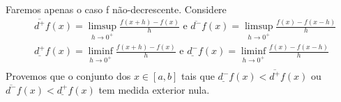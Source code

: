 \documentclass[analysis_notes.tex]{subfiles}
\begin{document}
\begin{proof*}
	Faremos apenas o caso f não-decrescente. Considere
	\begin{align*}
		 & \overline{d^{+}}f(x) = \limsup_{h\to 0^{+}} \frac{f(x+h)-f(x)}{h}\text{ e }\overline{d^{-}}f(x) = \limsup_{h\to 0^{+}}\frac{f(x) - f(x-h)}{h}   \\
		 & \underline{d^{+}}f(x) = \liminf_{h\to 0^{+}} \frac{f(x+h)-f(x)}{h}\text{ e }\underline{d^{-}}f(x) = \liminf_{h\to 0^{+}}\frac{f(x) - f(x-h)}{h} \\
	\end{align*}
	Provemos que o conjunto dos \(x\in[a, b]\) tais que \(\underline{d^{-}}f(x) < \overline{d^{+}}f(x)\)
	ou \(\overline{d^{-}}f(x) < \underline{d^{+}}f(x)\) tem medida exterior nula.
\end{proof*}
\end{document}
